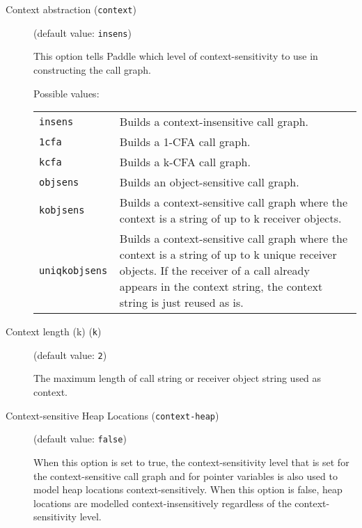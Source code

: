 \documentclass{article}
\begin{document}
\begin{description}

\item[Context abstraction ({\tt context})]
(default value: {\tt insens})




This option tells Paddle which level of context-sensitivity to use in constructing the call graph.




Possible values:\\
\begin{longtable}{p{1in}p{4in}}

{\tt insens }
&

Builds a context-insensitive call graph.
\\

{\tt 1cfa }
&

Builds a 1-CFA call graph.
\\

{\tt kcfa }
&

Builds a k-CFA call graph.
\\

{\tt objsens }
&

Builds an object-sensitive call graph.
\\

{\tt kobjsens }
&

Builds a context-sensitive call graph where the context is a string of up to
k receiver objects.
\\

{\tt uniqkobjsens }
&

Builds a context-sensitive call graph where the context is a string of up to
k unique receiver objects. If the receiver of a call already appears in the
context string, the context string is just reused as is.
\\

\end{longtable}


\item[Context length (k) ({\tt k})]
(default value: {\tt 2})




                                        The maximum length of call string or receiver object string used as context.
                


\item[Context-sensitive Heap Locations ({\tt context-heap})]
(default value: {\tt false})




When this option is set to true, the context-sensitivity level that is set
for the context-sensitive call graph and for pointer variables is also used
to model heap locations context-sensitively. When this option is false,
heap locations are modelled context-insensitively regardless of the
context-sensitivity level.
        


\end{description}
\end{document}

